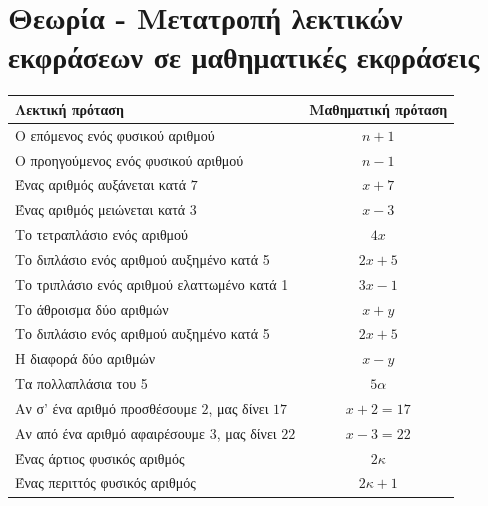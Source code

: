 \documentclass[a4paper,10pt]{report}
\begin{document}
\section*{Θεωρία - Μετατροπή λεκτικών εκφράσεων σε μαθηματικές εκφράσεις\hfill \small{}}
\begin{center}
 \begin{tabular}{|l|c|}\hline 
\textbf{Λεκτική πρόταση} \quad        &    \textbf{Μαθηματική πρόταση}       \\
\hline 
Ο επόμενος ενός φυσικού αριθμού                      & $n+1$        \\
\hline 
Ο προηγούμενος ενός φυσικού αριθμού                  & $n-1$ \\           
\hline
Ένας αριθμός αυξάνεται κατά $7$                      & $x+7$        \\
\hline
Ένας αριθμός μειώνεται κατά $3$                      & $x-3$\\
\hline
Το τετραπλάσιο ενός αριθμού                          &  $4x$     \\
\hline 
Το διπλάσιο ενός αριθμού αυξημένο κατά 5             &  $2x+5$     \\
\hline 
Το τριπλάσιο ενός αριθμού ελαττωμένο κατά 1          &  $3x-1$     \\
\hline 
Το άθροισμα δύο αριθμών                              &  $x+y$     \\
\hline 
Το διπλάσιο ενός αριθμού αυξημένο κατά 5             &  $2x+5$     \\
\hline 
Η διαφορά δύο αριθμών                                &  $x-y$     \\
\hline 
Τα πολλαπλάσια του  5                                &  $5α$     \\
\hline 
Αν σ' ένα αριθμό προσθέσουμε $2$, μας δίνει $17$     &  $x+2=17$     \\
\hline 
Αν από ένα αριθμό αφαιρέσουμε $3$, μας δίνει $22$    &  $x-3=22$     \\
\hline 
Ένας άρτιος φυσικός αριθμός                          &  $2κ$     \\
\hline 
Ένας περιττός φυσικός αριθμός                        &  $2κ+1$     \\
\hline 
\end{tabular}
\end{center}
\end{document}
